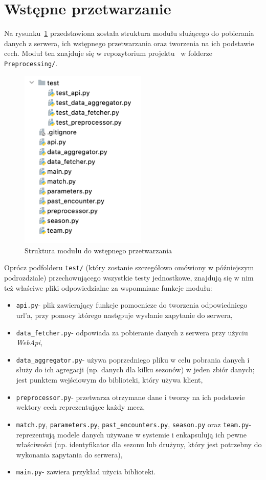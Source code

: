     \section{Wstępne przetwarzanie}
    \noindent Na rysunku~\ref{fig:preprocessing_structure} przedstawiona została struktura modułu służącego do pobierania danych z serwera, ich wstępnego przetwarzania oraz tworzenia na ich podstawie cech. Moduł ten znajduje się w repozytorium projektu~\cite{repo} w folderze \texttt{Preprocessing/}.
    \begin{figure}[H] 
        \centering\includegraphics[width=6cm]{figures/preprocessing_structure.png}
        \caption{Struktura modułu do wstępnego przetwarzania}
        \label{fig:preprocessing_structure}
    \end{figure}
    
    Oprócz podfolderu \texttt{test/} (który zostanie szczegółowo omówiony w późniejszym podrozdziale) przechowującego wszystkie testy jednostkowe, znajdują się w nim też właściwe pliki odpowiedzialne za wspomniane funkcje modułu:
    
    \begin{itemize}
        \item \texttt{api.py}- plik zawierający funkcje pomocnicze do tworzenia odpowiedniego url'a, przy pomocy którego następuje wysłanie zapytanie do serwera,
        \item \texttt{data\_fetcher.py}- odpowiada za pobieranie danych z serwera przy użyciu \emph{WebApi},
        \item \texttt{data\_aggregator.py}- używa poprzedniego pliku w celu pobrania danych i służy do ich agregacji (np. danych dla kilku sezonów) w jeden zbiór danych; jest punktem wejściowym do biblioteki, który używa klient,
        \item \texttt{preprocessor.py}- przetwarza otrzymane dane i tworzy na ich podstawie wektory cech reprezentujące każdy mecz,
        \item \texttt{match.py}, \texttt{parameters.py}, \texttt{past\_encounters.py}, \texttt{season.py} oraz \texttt{team.py}- reprezentują modele danych używane w systemie i enkapsulują ich pewne właściwości (np. identyfikator dla sezonu lub drużyny, który jest potrzebny do wykonania zapytania do serwera),
        \item \texttt{main.py}- zawiera przykład użycia biblioteki.
    \end{itemize}
    
